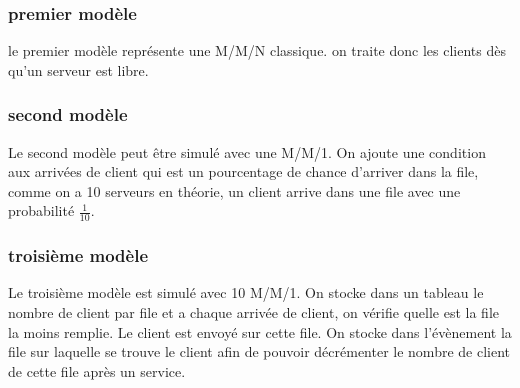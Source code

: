 \documentclass[a4paper,11pt]{article}
\begin{document}
	\subsubsection{premier modèle}
		le premier modèle représente une M/M/N classique. on traite donc les clients dès qu'un serveur est libre.
	\subsubsection{second modèle}
		Le second modèle peut être simulé avec une M/M/1. On ajoute une condition aux arrivées de client qui est un pourcentage de chance d'arriver dans la file, comme on a 10 serveurs en théorie, un client arrive dans une file avec une probabilité $\frac{1}{10}$.
	\subsubsection{troisième modèle}
		Le troisième modèle est simulé avec 10 M/M/1. On stocke dans un tableau le nombre de client par file et a chaque arrivée de client, on vérifie quelle est la file la moins remplie. Le client est envoyé sur cette file. On stocke dans l'évènement la file sur laquelle se trouve le client afin de pouvoir décrémenter le nombre de client de cette file après un service. 
	
\end{document}
